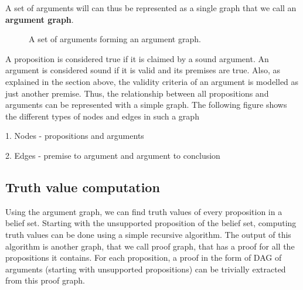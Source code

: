 \documentclass[a4paper]{article}
\begin{document}
A set of arguments will can thus be represented as a single graph that we call an \textbf{argument graph}.

\begin{figure}[ht]
\begin{center}
\caption{A set of arguments forming an argument graph.}
\label{argument_graph}
\end{center}
\end{figure}

A proposition is considered true if it is claimed by a sound argument. An argument is considered sound if it is valid and its premises are true. Also, as explained in the section above, the validity criteria of an argument is modelled as just another premise. Thus, the relationship between all propositions and arguments can be represented with a simple graph. The following figure shows the different types of nodes and edges in such a graph

1. Nodes - propositions and arguments

2. Edges - premise to argument and argument to conclusion

\subsection{Truth value computation}

Using the argument graph, we can find truth values of every proposition in a belief set. Starting with the unsupported proposition of the belief set, computing truth values can be done using a simple recursive algorithm. The output of this algorithm is another graph, that we call proof graph, that has a proof for all the propositions it contains. For each proposition, a proof in the form of DAG of arguments (starting with unsupported propositions) can be trivially extracted from this proof graph.
\end{document}
